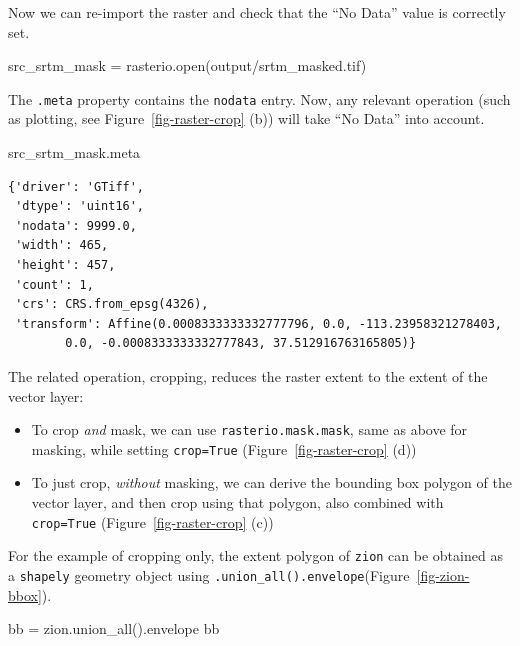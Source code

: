 \documentclass[
  letterpaper,
]{krantz}
\newenvironment{Shaded}{\begin{snugshade}}{\end{snugshade}}
\newcommand{\BuiltInTok}[1]{\textcolor[rgb]{0.00,0.23,0.31}{#1}}
\newcommand{\NormalTok}[1]{\textcolor[rgb]{0.00,0.23,0.31}{#1}}
\newcommand{\OperatorTok}[1]{\textcolor[rgb]{0.37,0.37,0.37}{#1}}
\newcommand{\StringTok}[1]{\textcolor[rgb]{0.13,0.47,0.30}{#1}}
\providecommand{\tightlist}{%
  \setlength{\itemsep}{0pt}\setlength{\parskip}{0pt}}\usepackage{longtable,booktabs,array}
\begin{document}
Now we can re-import the raster and check that the ``No Data'' value is
correctly set.

\begin{Shaded}
\begin{Highlighting}[]
\NormalTok{src\_srtm\_mask }\OperatorTok{=}\NormalTok{ rasterio.}\BuiltInTok{open}\NormalTok{(}\StringTok{\textquotesingle{}output/srtm\_masked.tif\textquotesingle{}}\NormalTok{)}
\end{Highlighting}
\end{Shaded}

The \texttt{.meta} property contains the \texttt{nodata} entry. Now, any
relevant operation (such as plotting, see Figure~\ref{fig-raster-crop}
(b)) will take ``No Data'' into account.

\begin{Shaded}
\begin{Highlighting}[]
\NormalTok{src\_srtm\_mask.meta}
\end{Highlighting}
\end{Shaded}

\begin{verbatim}
{'driver': 'GTiff',
 'dtype': 'uint16',
 'nodata': 9999.0,
 'width': 465,
 'height': 457,
 'count': 1,
 'crs': CRS.from_epsg(4326),
 'transform': Affine(0.0008333333332777796, 0.0, -113.23958321278403,
        0.0, -0.0008333333332777843, 37.512916763165805)}
\end{verbatim}

The related operation, cropping, reduces the raster extent to the extent
of the vector layer:

\begin{itemize}
\tightlist
\item
  To crop \emph{and} mask, we can use \texttt{rasterio.mask.mask}, same
  as above for masking, while setting \texttt{crop=True}
  (Figure~\ref{fig-raster-crop} (d))
\item
  To just crop, \emph{without} masking, we can derive the bounding box
  polygon of the vector layer, and then crop using that polygon, also
  combined with \texttt{crop=True} (Figure~\ref{fig-raster-crop} (c))
\end{itemize}

For the example of cropping only, the extent polygon of \texttt{zion}
can be obtained as a \texttt{shapely} geometry object using
\texttt{.union\_all().envelope}(Figure~\ref{fig-zion-bbox}).

\begin{Shaded}
\begin{Highlighting}[]
\NormalTok{bb }\OperatorTok{=}\NormalTok{ zion.union\_all().envelope}
\NormalTok{bb}
\end{Highlighting}
\end{Shaded}
\end{document}
